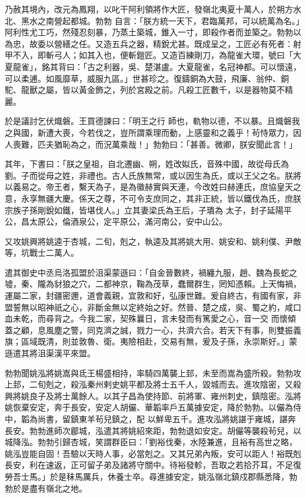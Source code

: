 \begin{pinyinscope}
 乃赦其境內，改元為鳳翔，以叱干阿利領將作大匠，發嶺北夷夏十萬人，於朔方水北、黑水之南營起都城。勃勃
 自言：「朕方統一天下，君臨萬邦，可以統萬為名。」阿利性尤工巧，然殘忍刻暴，乃蒸土築城，錐入一寸，即殺作者而並築之。勃勃以為忠，故委以營繕之任。又造五兵之器，精銳尤甚。既成呈之，工匠必有死者：射甲不入，即斬弓人；如其入也，便斬鎧匠。又造百練剛刀，為龍雀大環，號曰「大夏龍雀」，銘其背曰：「古之利器，吳、楚湛盧。大夏龍雀，名冠神都。可以懷遠，可以柔逋。如風靡草，威服九區。」世甚珍之。復鑄銅為大鼓，飛廉、翁仲、銅駝、龍獸之屬，皆以黃金飾之，列於宮殿之前。凡殺工匠數千，以是器物莫不精麗。



 於是議討乞伏熾磐。王買德諫曰：「明王之行
 師也，軌物以德，不以暴。且熾磐我之與國，新遭大喪，今若伐之，豈所謂乘理而動，上感靈和之義乎！茍恃眾力，因人喪難，匹夫猶恥為之，而況萬乘哉！」勃勃曰：「甚善。微卿，朕安聞此言！」



 其年，下書曰：「朕之皇祖，自北遷幽、朔，姓改姒氏，音殊中國，故從母氏為劉。子而從母之姓，非禮也。古人氏族無常，或以因生為氏，或以王父之名。朕將以義易之。帝王者，繫天為子，是為徽赫實與天連，今改姓曰赫連氏，庶協皇天之意，永享無疆大慶。係天之尊，不可令支庶同之，其非正統，皆以鐵伐為氏，庶朕宗族子孫剛銳如鐵，皆堪伐人。」立其妻梁氏為王后，子璝為
 太子，封子延陽平公，昌太原公，倫酒泉公，定平原公，滿河南公，安中山公。



 又攻姚興將姚逵于杏城，二旬，剋之，執逵及其將姚大用、姚安和、姚利僕、尹敵等，坑戰士二萬人。



 遣其御史中丞烏洛孤盟於沮渠蒙遜曰：「自金晉數終，禍纏九服，趙、魏為長蛇之墟，秦、隴為豺狼之穴，二都神京，鞠為茂草，蠢爾群生，罔知憑賴。上天悔禍，運屬二家，封疆密邇，道會義親，宜敦和好，弘康世難。爰自終古，有國有家，非盟誓無以昭神祇之心，非斷金無以定終始之好。然晉、楚之成，吳、蜀之約，咸口血未乾，而尋背之。今我二家，契殊曩日，言未發而有篤愛之心，音一交
 而懷傾蓋之顧，息風塵之警，同克濟之誠，戮力一心，共濟六合。若天下有事，則雙振義旗；區域既清，則並敦魯、衛。夷險相赴，交易有無，爰及子孫，永崇斯好。」蒙遜遣其將沮渠漢平來盟。



 勃勃聞姚泓將姚嵩與氐王楊盛相持，率騎四萬襲上邽，未至而嵩為盛所殺。勃勃攻上邽，二旬剋之，殺泓秦州剌史姚平都及將士五千人，毀城而去。進攻陰密，又殺興將姚良子及將士萬餘人。以其子昌為使持節、前將軍、雍州刺史，鎮陰密。泓將姚恢棄安定，奔于長安，安定人胡儼、華韜率戶五萬據安定，降於勃勃。以儼為侍中，韜為尚書，留鎮東羊茍兒鎮之，配
 以鮮卑五千。進攻泓將姚諶于雍城，諶奔長安。勃勃進師次郿城，泓遣其將姚紹來距，勃勃退如安定。胡儼等襲殺茍兒，以城降泓。勃勃引歸杏城，笑謂群臣曰：「劉裕伐秦，水陸兼進，且裕有高世之略，姚泓豈能自固！吾驗以天時人事，必當剋之。又其兄弟內叛，安可以距人！裕既剋長安，利在速返，正可留子弟及諸將守關中。待裕發軫，吾取之若拾芥耳，不足復勞吾士馬。」於是秣馬厲兵，休養士卒。尋進據安定，姚泓嶺北鎮戍郡縣悉降，勃勃於是盡有嶺北之地。




\end{pinyinscope}
